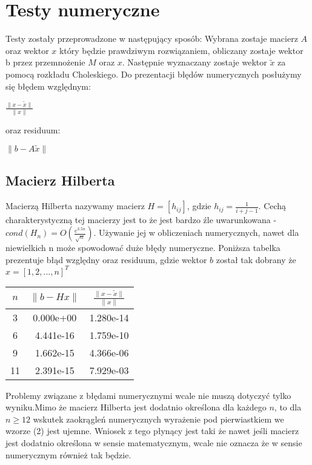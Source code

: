 \documentclass[11pt,wide]{article}
\begin{document}
\section{Testy numeryczne}
Testy zostały przeprowadzone w następujący sposób:\newline
Wybrana zostaje macierz $A$ oraz wektor $x$ który będzie prawdziwym rozwiązaniem, obliczany zostaje wektor b przez przemnożenie $M$ oraz $x$. Następnie wyznaczany zostaje wektor $\tilde{x}$ za pomocą rozkładu Choleskiego.\newline
Do prezentacji błędów numerycznych posłużymy się błędem względnym:
\begin{center}
$\frac{\lVert x - \tilde{x} \rVert}{\lVert x \rVert}$
\end{center}
oraz residuum:
\begin{center}
$\lVert b - A\tilde{x} \rVert$
\end{center}

\subsection{Macierz Hilberta}
Macierzą Hilberta nazywamy macierz $H = [h_{ij}]$, gdzie $h_{ij} = \frac{1}{i+j-1}$. Cechą charakterystyczną tej macierzy jest to że jest bardzo źle uwarunkowana - $cond(H_n) = O(\frac{e^{3.5n}}{\sqrt{n}})$. Używanie jej w obliczeniach numerycznych, nawet dla niewielkich n może spowodować duże błędy numeryczne.\newline
Poniższa tabelka prezentuje błąd względny oraz residuum, gdzie wektor $b$ został tak dobrany że $x = [1, 2, ..., n]^T$

\begin{center}
\begin{tabular}{|c|c|c|}
  \hline 
  	$n$ & $\lVert b - Hx\rVert$ & $\frac{\lVert x - \tilde{x} \rVert}{\lVert x \rVert}$  \\ \hline
  	3 & 0.000e+00 & 1.280e-14\\ \hline
	6 & 4.441e-16 & 1.759e-10\\ \hline
	9 & 1.662e-15 & 4.366e-06\\ \hline
	11 & 2.391e-15 & 7.929e-03\\ \hline

\end{tabular}
\end{center}
\noindent
Problemy związane z błędami numerycznymi wcale nie muszą dotyczyć tylko wyniku.Mimo że macierz Hilberta jest dodatnio określona dla każdego $n$, to dla $n \geq 12$ wskutek zaokrągleń numerycznych wyrażenie pod pierwiastkiem we wzorze (2) jest ujemne. Wniosek z tego płynący jest taki że nawet jeśli macierz jest dodatnio określona w sensie matematycznym, wcale nie oznacza że w sensie numerycznym również tak będzie.
\end{document}
